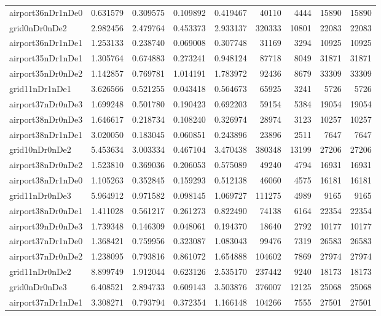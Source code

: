 \begin{longtable}{|l|r|r|r|r|r|r|r|r|}
airport36nDr1nDe0 & 0.631579 & 0.309575 & 0.109892 & 0.419467 & 40110 & 4444 & 15890 & 15890 \\
grid0nDr0nDe2 & 2.982456 & 2.479764 & 0.453373 & 2.933137 & 320333 & 10801 & 22083 & 22083 \\
airport36nDr1nDe1 & 1.253133 & 0.238740 & 0.069008 & 0.307748 & 31169 & 3294 & 10925 & 10925 \\
airport35nDr1nDe1 & 1.305764 & 0.674883 & 0.273241 & 0.948124 & 87718 & 8049 & 31871 & 31871 \\
airport35nDr0nDe2 & 1.142857 & 0.769781 & 1.014191 & 1.783972 & 92436 & 8679 & 33309 & 33309 \\
grid11nDr1nDe1 & 3.626566 & 0.521255 & 0.043418 & 0.564673 & 65925 & 3241 & 5726 & 5726 \\
airport37nDr0nDe3 & 1.699248 & 0.501780 & 0.190423 & 0.692203 & 59154 & 5384 & 19054 & 19054 \\
airport38nDr0nDe3 & 1.646617 & 0.218734 & 0.108240 & 0.326974 & 28974 & 3123 & 10257 & 10257 \\
airport38nDr1nDe1 & 3.020050 & 0.183045 & 0.060851 & 0.243896 & 23896 & 2511 & 7647 & 7647 \\
grid10nDr0nDe2 & 5.453634 & 3.003334 & 0.467104 & 3.470438 & 380348 & 13199 & 27206 & 27206 \\
airport38nDr0nDe2 & 1.523810 & 0.369036 & 0.206053 & 0.575089 & 49240 & 4794 & 16931 & 16931 \\
airport38nDr1nDe0 & 1.105263 & 0.352845 & 0.159293 & 0.512138 & 46060 & 4575 & 16181 & 16181 \\
grid11nDr0nDe3 & 5.964912 & 0.971582 & 0.098145 & 1.069727 & 111275 & 4989 & 9165 & 9165 \\
airport38nDr0nDe1 & 1.411028 & 0.561217 & 0.261273 & 0.822490 & 74138 & 6164 & 22354 & 22354 \\
airport39nDr0nDe3 & 1.739348 & 0.146309 & 0.048061 & 0.194370 & 18640 & 2792 & 10177 & 10177 \\
airport37nDr1nDe0 & 1.368421 & 0.759956 & 0.323087 & 1.083043 & 99476 & 7319 & 26583 & 26583 \\
airport37nDr0nDe2 & 1.238095 & 0.793816 & 0.861072 & 1.654888 & 104602 & 7869 & 27974 & 27974 \\
grid11nDr0nDe2 & 8.899749 & 1.912044 & 0.623126 & 2.535170 & 237442 & 9240 & 18173 & 18173 \\
grid0nDr0nDe3 & 6.408521 & 2.894733 & 0.609143 & 3.503876 & 376007 & 12125 & 25068 & 25068 \\
airport37nDr1nDe1 & 3.308271 & 0.793794 & 0.372354 & 1.166148 & 104266 & 7555 & 27501 & 27501 \\

\end{longtable}
